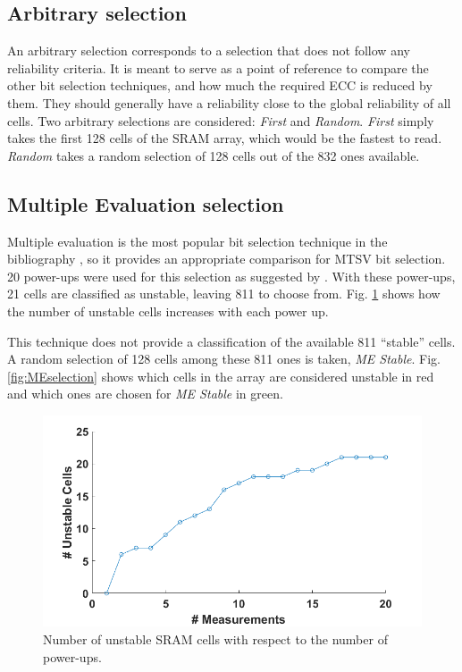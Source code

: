 \subsection{Arbitrary selection}

An arbitrary selection corresponds to a selection that does not follow any reliability criteria. It is meant to serve as a point of reference to compare the other bit selection techniques, and how much the required ECC is reduced by them. They should generally have a reliability close to the global reliability of all cells. Two arbitrary selections are considered: \textit{First} and \textit{Random}. \textit{First} simply takes the first 128 cells of the SRAM array, which would be the fastest to read. \textit{Random} takes a random selection of 128 cells out of the 832 ones available. 

\subsection{Multiple Evaluation selection}

Multiple evaluation is the most popular bit selection technique in the bibliography \cite{Delvaux2015,Baturone2015,Bhargava2012}, so it provides an appropriate comparison for MTSV bit selection. 20 power-ups were used for this selection as suggested by \cite{Baturone2015}. With these power-ups, 21 cells are classified as unstable, leaving 811 to choose from. Fig. \ref{fig:MEunstable_progression} shows how the number of unstable cells increases with each power up.


This technique does not provide a classification of the available 811 ``stable'' cells. A random selection of 128 cells among these 811 ones is taken, \textit{ME Stable}. Fig. \ref{fig:MEselection} shows which cells in the array are considered unstable in red and which ones are chosen for \textit{ME Stable} in green.

\begin{figure}[H]
    \centering
    \includegraphics[width=14cm]{images/MEunstable_progression.png}
    \caption{Number of unstable SRAM cells with respect to the number of power-ups.}
    \label{fig:MEunstable_progression}
\end{figure}




